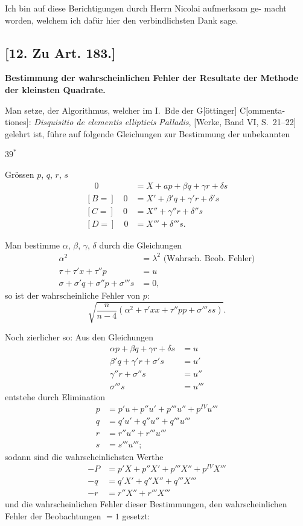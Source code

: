\documentclass[12pt,a4paper]{article}
\begin{document}
Ich bin auf diese Berichtigungen durch Herrn Nicolai aufmerksam ge-
macht worden, welchem ich daf\"ur hier den verbindlichsten Dank sage.

\subsection*{[12. Zu Art. 183.]}
\textbf{Bestimmung der wahrscheinlichen Fehler der Resultate
der Methode der kleinsten Quadrate.}

Man setze, der Algorithmus, welcher im I.~Bde der G[\"ottinger] C[ommenta-
tiones]: \textit{Disquisitio de elementis ellipticis Palladis}, [Werke, Band VI, S.~21--22]
gelehrt ist, f\"uhre auf folgende Gleichungen zur Bestimmung der unbekannten

\begin{center}
$39^*$
\end{center}

Gr\"ossen $p$, $q$, $r$, $s$
\begin{align*}
[A =]\quad 0 &= X + ap + \beta q + \gamma r + \delta s \\
[B =]\quad 0 &= X' + \beta'q + \gamma'r + \delta's \\
[C =]\quad 0 &= X'' + \gamma''r + \delta''s \\
[D =]\quad 0 &= X''' + \delta'''s.
\end{align*}

Man bestimme $\alpha$, $\beta$, $\gamma$, $\delta$ durch die Gleichungen
\begin{align*}
\alpha^2 &= \lambda^2 \text{ (Wahrsch.~Beob.~Fehler)} \\
\tau + \tau'x + \tau''p &= u \\
\sigma + \sigma'q + \sigma''p + \sigma'''s &= 0,
\end{align*}
so ist der wahrscheinliche Fehler von $p$:
\[
\sqrt{\frac{n}{n - 4}(\alpha^2 + \tau'xx + \tau''pp + \sigma'''ss)}.
\]

Noch zierlicher so: Aus den Gleichungen
\begin{align*}
\alpha p + \beta q + \gamma r + \delta s &= u \\
\beta'q + \gamma'r + \sigma's &= u' \\
\gamma''r + \sigma''s &= u'' \\
\sigma'''s &= u'''
\end{align*}
entstehe durch Elimination
\begin{align*}
p &= p'u + p''u' + p'''u'' + p^{IV}u''' \\
q &= q'u' + q''u'' + q'''u''' \\
r &= r''u'' + r'''u''' \\
s &= s'''u''';
\end{align*}
sodann sind die wahrscheinlichsten Werthe
\begin{align*}
-P &= p'X + p''X' + p'''X'' + p^{IV}X''' \\
-q &= q'X' + q''X'' + q'''X''' \\
-r &= r''X'' + r'''X'''
\end{align*}
und die wahrscheinlichen Fehler dieser Bestimmungen, den wahrscheinlichen
Fehler der Beobachtungen $= 1$ gesetzt:
\end{document}
